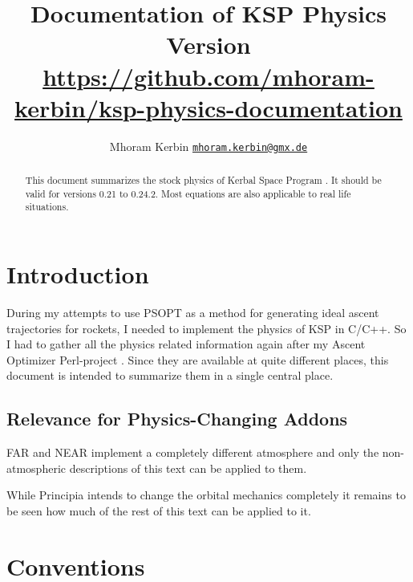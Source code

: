 \documentclass[11pt]{article}
\begin{document}
\title{Documentation of KSP Physics\\\small{Version }\\\vspace{1 em}\url{https://github.com/mhoram-kerbin/ksp-physics-documentation}}
\author {Mhoram Kerbin \href{mailto:mhoram.kerbin@gmx.de}{\nolinkurl{mhoram.kerbin@gmx.de}}}

\maketitle

\begin{abstract}

  This document summarizes the stock physics of Kerbal Space Program
  \cite{KSP}. It should be valid for versions 0.21 to 0.24.2. Most
  equations are also applicable to real life situations.

\end{abstract}

\tableofcontents

\section{Introduction}

During my attempts to use PSOPT as a method for generating ideal
ascent trajectories for rockets, I needed to implement the physics of
KSP in C/C++. So I had to gather all the physics related information
again after my Ascent Optimizer Perl-project \cite{PAO}. Since they
are available at quite different places, this document is intended to
summarize them in a single central place.

\subsection{Relevance for Physics-Changing Addons}

FAR \cite{FAR} and NEAR \cite{NEAR} implement a completely different
atmosphere and only the non-atmospheric descriptions of this text can
be applied to them.

While Principia \cite{principia} intends to change the orbital
mechanics completely it remains to be seen how much of the rest of
this text can be applied to it.


\section{Conventions}
\end{document}
